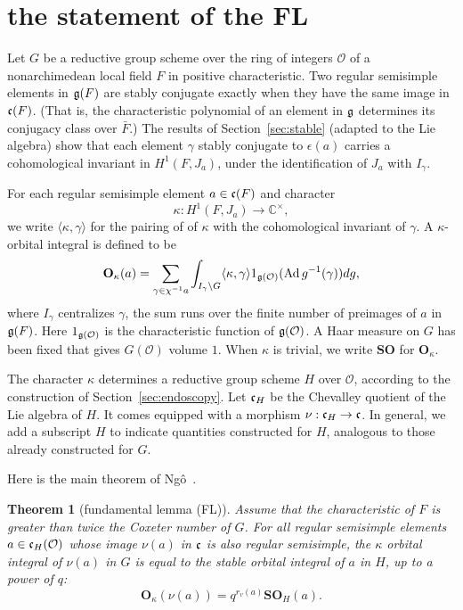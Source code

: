\documentclass[brochure,english,12pt]{bourbaki}
\newtheorem{theorem}[equation]{Theorem}
\def\op#1{{\operatorname{#1}}}
\newcommand{\ring}[1]{\mathbb{#1}}
\def\SO{{\mathbf {SO}}}
\def\OO{{\mathbf O}}
\def\g{\frak{g}}
\def\cc{\frak{c}}
\def\O{{\mathcal O}}
\begin{document}
\section{the statement of the FL}\label{sec:statement}

Let $G$ be a reductive group scheme over the ring of integers $\O$ of
a nonarchimedean local field $F$ in positive characteristic.  Two
regular semisimple elements in $\g(F)$ are stably conjugate exactly
when they have the same image in $\cc(F)$.  (That is, the
characteristic polynomial of an element in $\g$ determines its
conjugacy class over $\bar F$.)    The results of
Section~\ref{sec:stable} (adapted to the Lie algebra)
show that each element $\gamma$ stably conjugate to
$\epsilon(a)$ carries a cohomological invariant in $H^1(F,J_a)$, under the identification
of $J_a$ with $I_\gamma$.

For each regular semisimple element $a\in \cc(F)$ and character 
\[
\kappa:H^1(F,J_a)\to\ring{C}^\times,
\]
we write
 $\langle\kappa,\gamma\rangle$ for the pairing of
of $\kappa$ with the cohomological invariant of $\gamma$.
A 
$\kappa$-orbital integral is defined to be
\begin{equation}\label{eqn:k-orbital}
\OO_\kappa(a) = \sum_ {\gamma\in\chi^{-1} a} 
\int_{I_\gamma\backslash G} \langle\kappa,\gamma\rangle 1_{\g(\O)} (\op{Ad}\, g^{-1}(\gamma)) dg,
\end{equation}
where $I_\gamma$ centralizes $\gamma$, the sum runs over the finite
number of preimages of $a$ in $\g(F)$.  Here $1_{\g(\O)}$ is the
characteristic function of $\g(\O)$.  A Haar measure on $G$ has been fixed that gives $G(\O)$
volume $1$.  When $\kappa$ is trivial, we
write $\SO$ for $\OO_\kappa$.

The character $\kappa$ determines a reductive group scheme $H$ over $\O$,
according to the construction of Section~\ref{sec:endoscopy}.
  Let $\cc_H$ be the
Chevalley quotient of the Lie algebra of $H$.  It comes equipped with a morphism $\nu:\cc_H\to\cc$.
In general, we  add a subscript $H$ to indicate
quantities constructed for  $H$, analogous to those already constructed for $G$.

Here is the main theorem of Ng\^o~\cite{NBC:2010}.

\begin{theorem}[fundamental lemma (FL)]
Assume that the characteristic of $F$ is greater than twice the Coxeter number of $G$.
For all regular semisimple elements $a\in \cc_H(\O)$ whose image
$\nu(a)$ in $\cc$ is also regular semisimple, the $\kappa$ orbital integral of $\nu(a)$ in $G$ is
equal to the stable orbital integral of $a$ in $H$, up to a power of $q$:
\[
\OO_\kappa(\nu(a)) = q^{r_v(a)}\SO_H(a).
\]
\end{theorem}
\end{document}
